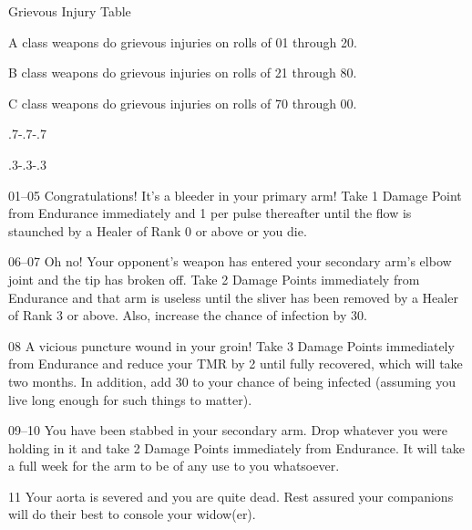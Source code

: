 \begin{Chapter}{Grievous Injury Table}

\begin{Enumerate}
\item A class weapons do grievous injuries on rolls of 01 through 20.  
\item B class weapons do grievous injuries on rolls of 21 through 80.  
\item C class weapons do grievous injuries on rolls of 70 through 00.
\end{Enumerate}

\smallskip

\makeatletter
\patchcmd{\@item}
  {\addvspace\itemsep}
  {\par\kern\dimexpr.7\itemsep-.7\parskip-.7\baselineskip\relax%
   \hrulefill%
   \par\kern\dimexpr.3\itemsep-.3\parskip-.3\baselineskip\relax}
  {}{}%
\makeatother
  
\begin{Description}
\item[01–05] Congratulations! It’s a bleeder in your primary arm! Take
  1 Damage Point from Endurance immediately and 1 per pulse thereafter
  until the flow is staunched by a Healer of Rank 0 or above or you
  die.

\item[06–07] Oh no! Your opponent’s weapon has entered your secondary
  arm’s elbow joint and the tip has broken off. Take 2 Damage Points
  immediately from Endurance and that arm is useless until the sliver
  has been removed by a Healer of Rank 3 or above. Also, increase the
  chance of infection by 30.

\item[08] A vicious puncture wound in your groin!  Take 3 Damage
  Points immediately from Endurance and reduce your TMR by 2 until
  fully recovered, which will take two months. In addition, add 30 to
  your chance of being infected (assuming you live long enough for
  such things to matter).

\item[09–10] You have been stabbed in your secondary arm. Drop
  whatever you were holding in it and take 2 Damage Points immediately
  from Endurance. It will take a full week for the arm to be of any
  use to you whatsoever.

\item[11] Your aorta is severed and you are quite dead. Rest assured
  your companions will do their best to console your widow(er).


\end{Description}
\end{Chapter}
